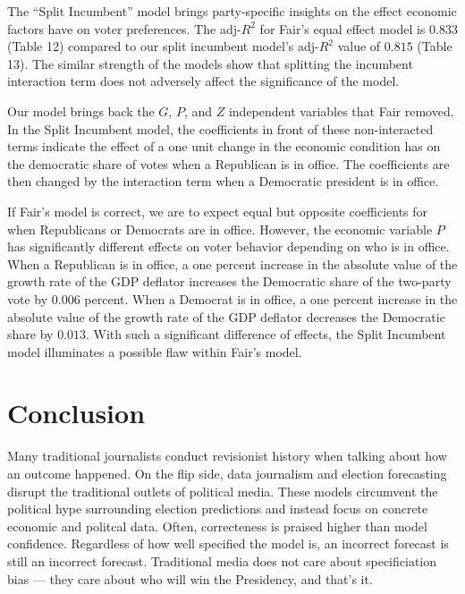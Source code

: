 \documentclass[11,]{article}
\begin{document}
The ``Split Incumbent'' model brings party-specific insights on the
effect economic factors have on voter preferences. The adj-\(R^2\) for
Fair's equal effect model is \(0.833\) (Table 12) compared to our split
incumbent model's adj-\(R^2\) value of \(0.815\) (Table 13). The similar
strength of the models show that splitting the incumbent interaction
term does not adversely affect the significance of the model.

Our model brings back the \(G\), \(P\), and \(Z\) independent variables
that Fair removed. In the Split Incumbent model, the coefficients in
front of these non-interacted terms indicate the effect of a one unit
change in the economic condition has on the democratic share of votes
when a Republican is in office. The coefficients are then changed by the
interaction term when a Democratic president is in office.

If Fair's model is correct, we are to expect equal but opposite
coefficients for when Republicans or Democrats are in office. However,
the economic variable \(P\) has significantly different effects on voter
behavior depending on who is in office. When a Republican is in office,
a one percent increase in the absolute value of the growth rate of the
GDP deflator increases the Democratic share of the two-party vote by
\(0.006\) percent. When a Democrat is in office, a one percent increase
in the absolute value of the growth rate of the GDP deflator decreases
the Democratic share by \(0.013\). With such a significant difference of
effects, the Split Incumbent model illuminates a possible flaw within
Fair's model.

\hypertarget{conclusion}{%
\section{Conclusion}\label{conclusion}}

Many traditional journalists conduct revisionist history when talking
about how an outcome happened. On the flip side, data journalism and
election forecasting disrupt the traditional outlets of political media.
These models circumvent the political hype surrounding election
predictions and instead focus on concrete economic and politcal data.
Often, correcteness is praised higher than model confidence. Regardless
of how well specified the model is, an incorrect forecast is still an
incorrect forecast. Traditional media does not care about specificiation
bias --- they care about who will win the Presidency, and that's it.
\end{document}
